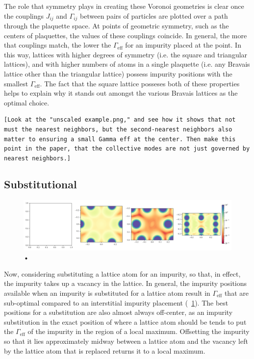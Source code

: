 \documentclass[aps,pra,superscriptaddress,twocolumn]{revtex4-1}
\newcommand{\fref}[1]{\text{Fig.}~\ref{#1}}
\newcommand{\commentTP}[1]{\texttt{\color{green}[#1]}}
\begin{document}
The role that symmetry plays in creating these Voronoi geometries is clear once the couplings $J_{ij}$ and $\Gamma_{ij}$ between pairs of particles are plotted over a path through the plaquette space. At points of geometric symmetry, such as the centers of plaquettes, the values of these couplings coincide. In general, the more that couplings match, the lower the $\Gamma_\text{eff}$ for an impurity placed at the point. In this way, lattices with higher degrees of symmetry (i.e. the square and triangular lattices), and with higher numbers of atoms in a single plaquette (i.e. any Bravais lattice other than the triangular lattice) possess impurity positions with the smallest $\Gamma_\text{eff}$. The fact that the square lattice posseses both of these properties helps to explain why it stands out amongst the various Bravais lattices as the optimal choice. 

\commentTP{Look at the "unscaled example.png," and see how it shows that not must the nearest neighbors, but the second-nearest neighbors also matter to ensuring a small Gamma eff at the center. Then make this point in the paper, that the collective modes are not just governed by nearest neighbors.}

\subsection{Substitutional}

\begin{figure}
    \centering
    \includegraphics[width=1.0\textwidth]{figures/temp_substitution_figure.png} 
    \caption{•}
    \label{fig:substitution}
\end{figure}

Now, considering substituting a lattice atom for an impurity, so that, in effect, the impurity takes up a vacancy in the lattice.
In general, the impurity positions available when an impurity is substituted for a lattice atom result in $\Gamma_\text{eff}$ that are sub-optimal compared to an interstitial impurity placement (\fref{fig:substitution}). The best positions for a substitution are also almost always off-center, as an impurity substitution in the exact position of where a lattice atom should be tends to put the $\Gamma_\text{eff}$ of the impurity in the region of a local maximum. Offsetting the impurity so that it lies approximately midway between a lattice atom and the vacancy left by the lattice atom that is replaced returns it to a local maximum. 
\end{document}
